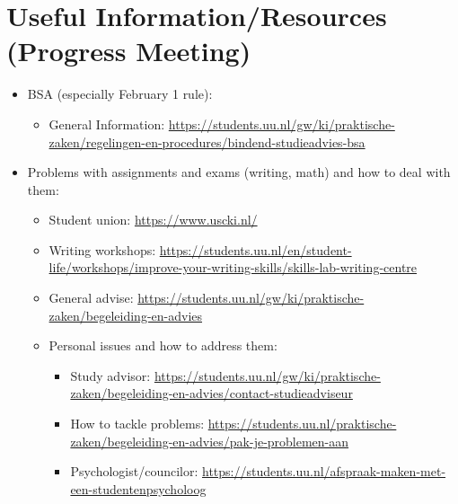 \chapter{Useful Information/Resources (Progress Meeting)}

	\begin{itemize}

		\item BSA (especially February 1 rule):

			\begin{itemize}

				\item General Information: \url{https://students.uu.nl/gw/ki/praktische-zaken/regelingen-en-procedures/bindend-studieadvies-bsa}

			\end{itemize}

		\item  Problems with assignments and exams (writing, math) and how to deal with them:

		\begin{itemize}

			\item Student union: \url{https://www.uscki.nl/}

			\item Writing workshops: \url{https://students.uu.nl/en/student-life/workshops/improve-your-writing-skills/skills-lab-writing-centre}

			\item General advise: \url{https://students.uu.nl/gw/ki/praktische-zaken/begeleiding-en-advies}

			\item Personal issues and how to address them:

			\begin{itemize}

                        \item Study advisor: \url{https://students.uu.nl/gw/ki/praktische-zaken/begeleiding-en-advies/contact-studieadviseur}

                        \item How to tackle problems: \url{https://students.uu.nl/praktische-zaken/begeleiding-en-advies/pak-je-problemen-aan}

				\item Psychologist/councilor: \url{https://students.uu.nl/afspraak-maken-met-een-studentenpsycholoog}

			\end{itemize}


\end{itemize}
\end{itemize}
